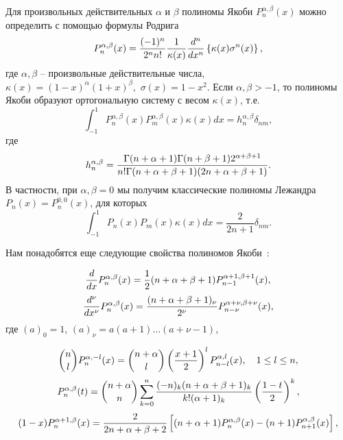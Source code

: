  Для произвольных действительных $\alpha$ и $\beta$ полиномы Якоби  $P_n^{\alpha,\beta}(x)$ можно определить \cite{Sege} с помощью формулы Родрига
 \begin{equation}\label{sobleg-2.1}
P_n^{\alpha,\beta}(x) = {(-1)^n\over2^nn!}{1\over\kappa(x)}{d^n\over
dx^n} \left\{\kappa(x)\sigma^n(x)\right\},
\end{equation}
где $\alpha,\beta$ -- произвольные действительные числа, $\kappa(x)=
(1-x)^\alpha(1+x)^\beta,\,\,\sigma(x)=1-x^2$. Если
$\alpha,\beta>-1$, то полиномы Якоби образуют ортогональную
систему с весом $\kappa(x)$, т.е.
\begin{equation}\label{sobleg-2.2}
\int_{-1}^1P_n^{\alpha,\beta}(x)P_m^{\alpha,\beta}(x)\kappa(x)dx =
h_n^{\alpha,\beta}\delta_{nm},
\end{equation}
где
\begin{equation}\label{sobleg-2.3}
h_n^{\alpha,\beta} =
{\Gamma(n+\alpha+1)\Gamma(n+\beta+1)2^{\alpha+\beta+1} \over
n!\Gamma(n+\alpha+\beta+1)(2n+\alpha+\beta+1)}.
\end{equation}
В частности, при $\alpha,\beta=0$ мы получим классические полиномы Лежандра $P_n(x)=P_n^{0,0}(x)$, для которых
\begin{equation*}
\int_{-1}^1P_n(x)P_m(x)\kappa(x)dx = \frac{2}{2n+1}\delta_{nm}.
\end{equation*}



Нам понадобятся еще следующие свойства полиномов Якоби~\cite{Sege}:


\begin{equation}\label{sobleg-2.4}
{d\over dx}P_n^{\alpha,\beta}(x) =
{1\over2}(n+\alpha+\beta+1)P_{n-1}^{\alpha+1,\beta+1}(x),
\end{equation}
\begin{equation}\label{sobleg-2.5}
{d^\nu\over dx^\nu}P_n^{\alpha,\beta}(x) =
{(n+\alpha+\beta+1)_\nu\over2^\nu} P_{n-\nu}^{\alpha+\nu,\beta+\nu}(x),
\end{equation}
где $(a)_0=1$, $(a)_\nu=a(a+1)\dots(a+\nu-1)$,

 \begin{equation}\label{sobleg-2.6}
 {n\choose l}P_n^{\alpha,-l}(x)= {n+\alpha\choose
l}\left({x+1\over2}\right)^lP_{n-l}^{\alpha,l}(x),
     \quad 1\le l \le n,
\end{equation}
\begin{equation}\label{sobleg-2.7}
P_n^{\alpha,\beta}(t) ={n+\alpha\choose n}
\sum_{k=0}^n{(-n)_k(n+\alpha+\beta+1)_k\over k!(\alpha+1)_k}
\left({1-t\over 2}\right)^k,
\end{equation}
\begin{equation}\label{sobleg-2.8}
(1-x)P_n^{\alpha+1,\beta}(x)={2\over2n+\alpha+\beta+2}
\left[(n+ \alpha+1)P_n^{\alpha,\beta}(x)-
(n+1)P_{n+1}^{\alpha,\beta}(x)\right],
\end{equation}

